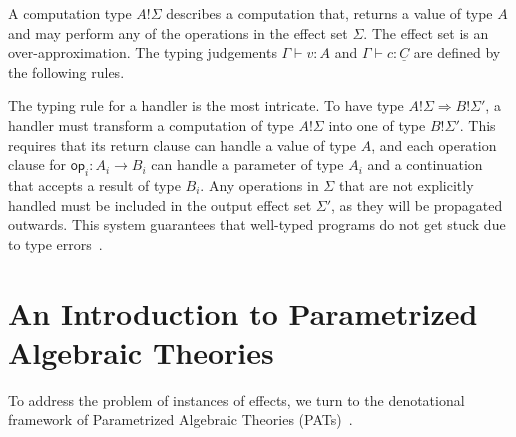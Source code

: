 \documentclass{article}
\theoremstyle{definition}
\theoremstyle{remark}
\newcommand\bang{\mathbin{!}}
\newcommand\comp[1]{\underline{#1}}
\newcommand\fun[2]{{\mathsf{fun} \ #1 \mapsto #2}}
\newcommand\handler[1]{{\mathsf{handler} \ \{ \ #1 \ \}}}
\newcommand\ret[1]{{\mathsf{return} \ #1}}
\newcommand\op{\mathsf{op}}
\newcommand{\doin}[3]{\mathsf{do}\, #1 \leftarrow #2\, \mathsf{in}\, #3}
\newcommand{\with}[2]{\mathsf{with}\, #1 \,\mathsf{handle} \,#2}
\newcommand{\app}[2]{{#1 \, #2}}
\newcommand{\jv}[3]{{#1 \vdash #2 : #3}}
\newcommand{\jc}[3]{{#1 \vdash #2 : #3}}
\begin{document}
A computation type $A\bang \Sigma$ describes a computation that, returns a value of type $A$ and may perform any of the operations in the effect set $\Sigma$.
The effect set is an over-approximation. The typing judgements $\jv \Gamma v A$ and $\jc \Gamma c {\comp{C}}$ are defined by the following rules.


The typing rule for a handler is the most intricate. To have type $A\bang\Sigma \Rightarrow B\bang\Sigma'$, a handler must transform a computation of type
$A\bang\Sigma$ into one of type $B\bang\Sigma'$.
This requires that its return clause can handle a value of type $A$, and each operation clause for $\op_i: A_i \to B_i$ can handle a parameter of type $A_i$
and a continuation that accepts a result of type $B_i$. Any operations in $\Sigma$ that are not explicitly handled must be included in the output effect set $\Sigma'$,
as they will be propagated outwards. This system guarantees that well-typed programs do not get stuck due to type errors~\cite{pretnar_introduction_2015}.

\section{An Introduction to Parametrized Algebraic Theories}

To address the problem of instances of effects, we turn to the denotational framework of Parametrized Algebraic Theories (PATs)~\cite{staton_instances_2013, staton_algebraic_2013}.
\end{document}
